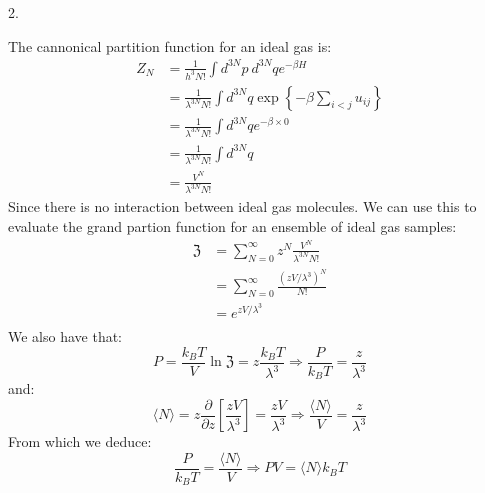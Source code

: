 \documentclass[a4paper,12pt]{article}
\begin{document}
2.
\begin{minipage}[t]{0.9\textwidth}
  The cannonical partition function for an ideal gas is:
  \begin{align*}
    Z_N &= \frac{1}{h^3N!} \int d^{3N}p_{\ } d^{3N}qe^{-\beta H}\\
        &= \frac{1}{\lambda^{3N}N!} \int d^{3N}q \exp\left\{-\beta \sum\limits_{i < j} u_{ij}\right\}\\
        &= \frac{1}{\lambda^{3N}N!} \int d^{3N}q e^{-\beta \times 0}\\
        &= \frac{1}{\lambda^{3N}N!} \int d^{3N}q \\
        &= \frac{V^N}{\lambda^{3N}N!}
  \end{align*}  
  Since there is no interaction between ideal gas molecules.
  We can use this to evaluate the grand partion function for an ensemble of ideal gas samples:
  \begin{align*}
    \mathfrak{Z} &= \sum_{N = 0}^\infty z^N \frac{V^N}{\lambda^{3N}N!}\\
                 &= \sum_{N = 0}^\infty \frac{(zV/\lambda^3)^N}{N!}\\
                 &= e^{zV/\lambda^3}\\
  \end{align*}
  We also have that:
  \begin{equation*}
    P = \frac{k_BT}{V} \ln \mathfrak{Z} = z\frac{k_BT}{\lambda^3} \Rightarrow \frac{P}{k_BT} = \frac{z}{\lambda^3}
  \end{equation*}
  and:
  \begin{equation*}
    \langle N\rangle = z \frac{\partial}{\partial z} \left[ \frac{zV}{\lambda^3} \right] = \frac{zV}{\lambda^3} \Rightarrow \frac{\langle N \rangle}{V} = \frac{z}{\lambda^3}
  \end{equation*}
  From which we deduce:
  \begin{equation*}
    \frac{P}{k_BT} = \frac{\langle N \rangle}{V} \Rightarrow PV = \langle N \rangle k_BT
  \end{equation*}
\end{minipage}
\end{document}
